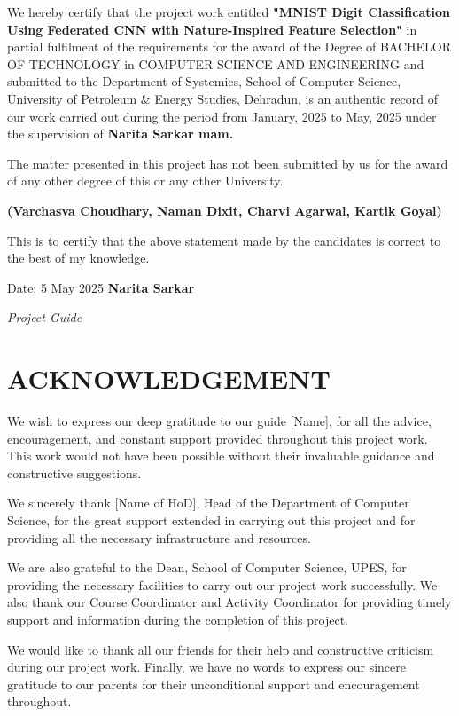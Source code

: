 \documentclass[
]{article}
\begin{document}
We hereby certify that the project work entitled \textbf{"MNIST Digit
Classification Using Federated CNN with Nature-Inspired Feature
Selection"} in partial fulfilment of the requirements for the award of
the Degree of BACHELOR OF TECHNOLOGY in COMPUTER SCIENCE AND ENGINEERING
and submitted to the Department of Systemics, School of Computer
Science, University of Petroleum \& Energy Studies, Dehradun, is an
authentic record of our work carried out during the period from January,
2025 to May, 2025 under the supervision of \textbf{Narita Sarkar mam.}

The matter presented in this project has not been submitted by us for
the award of any other degree of this or any other University.

\textbf{(Varchasva Choudhary, Naman Dixit, Charvi Agarwal, Kartik
Goyal)}

This is to certify that the above statement made by the candidates is
correct to the best of my knowledge.

Date: 5 May 2025 \textbf{Narita Sarkar}

\emph{Project Guide}

\hypertarget{acknowledgement}{%
\section{ACKNOWLEDGEMENT}\label{acknowledgement}}

We wish to express our deep gratitude to our guide {[}Name{]}, for all
the advice, encouragement, and constant support provided throughout this
project work. This work would not have been possible without their
invaluable guidance and constructive suggestions.

We sincerely thank {[}Name of HoD{]}, Head of the Department of Computer
Science, for the great support extended in carrying out this project and
for providing all the necessary infrastructure and resources.

We are also grateful to the Dean, School of Computer Science, UPES, for
providing the necessary facilities to carry out our project work
successfully. We also thank our Course Coordinator and Activity
Coordinator for providing timely support and information during the
completion of this project.

We would like to thank all our friends for their help and constructive
criticism during our project work. Finally, we have no words to express
our sincere gratitude to our parents for their unconditional support and
encouragement throughout.
\end{document}
